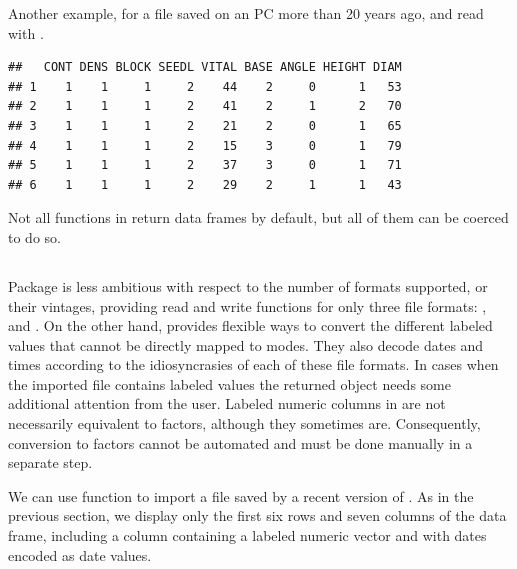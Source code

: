 \documentclass[krantz2]{krantz}\usepackage{knitr}
\begin{document}
Another example, for a  file saved on an PC more than 20 years ago, and read with .

\begin{knitrout}\footnotesize
{}\color{fgcolor}\begin{kframe}
\begin{alltt}
 \hlkwb{<-} \hlstd{(} \hlstd{=} \hlstd{)}
\end{alltt}
\begin{verbatim}
##   CONT DENS BLOCK SEEDL VITAL BASE ANGLE HEIGHT DIAM
## 1    1    1     1     2    44    2     0      1   53
## 2    1    1     1     2    41    2     1      2   70
## 3    1    1     1     2    21    2     0      1   65
## 4    1    1     1     2    15    3     0      1   79
## 5    1    1     1     2    37    3     0      1   71
## 6    1    1     1     2    29    2     1      1   43
\end{verbatim}
\end{kframe}
\end{knitrout}

Not all functions in  return data frames by default, but all of them can be coerced to do so.

\subsection[haven]{}



Package  is less ambitious with respect to the number of formats supported, or their vintages, providing read and write functions for only three file formats: ,  and . On the other hand,  provides flexible ways to convert the different labeled values that cannot be directly mapped to \Rlang modes. They also decode dates and times according to the idiosyncrasies of each of these file formats. In cases when the imported file contains labeled values the returned  object needs some additional attention from the user. Labeled numeric columns in  are not necessarily equivalent to factors, although they sometimes are. Consequently, conversion to factors cannot be automated and must be done manually in a separate step.

We can use function  to import a  file saved by a recent version of . As in the previous section, we display only the first six rows and seven columns of the data frame, including a column  containing a labeled numeric vector and  with dates encoded as \Rlang date values.
\end{document}

